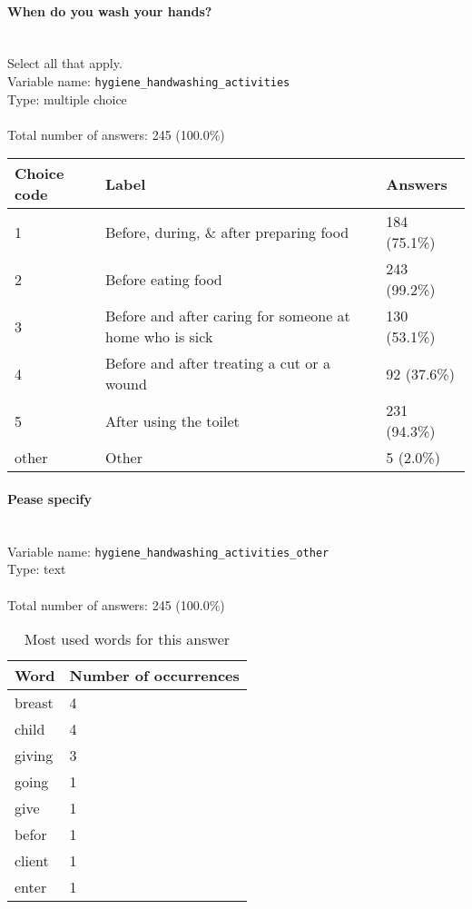 \documentclass[11.5pt, a4paper]{scrartcl}
\begin{document}
\paragraph{When do you wash your hands?}
\ \\ {\small Select all that apply.}
\  \\Variable name: \texttt{hygiene\_handwashing\_activities}\\
Type: multiple choice\\
\\Total number of answers: 245 (100.0\%)
\\[0.2em] \begin{tabular}{p{4cm}|p{8cm}|p{3cm}}
Choice code & Label & Answers \\
\hline
1 & Before, during, \& after preparing food& \cellcolor{color3}184 (75.1\%)\\
\cellcolor{mygray} 2 & \cellcolor{mygray}Before eating food & \cellcolor{color4}243 (99.2\%)\\
3 & Before and after caring for someone at home who is sick& \cellcolor{color2}130 (53.1\%)\\
\cellcolor{mygray} 4 & \cellcolor{mygray}Before and after treating a cut or a wound & \cellcolor{color1}92 (37.6\%)\\
5 & After using the toilet& \cellcolor{color4}231 (94.3\%)\\
\cellcolor{mygray} other & \cellcolor{mygray}Other & \cellcolor{color0}5 (2.0\%)\\
\end{tabular}
\paragraph{Pease specify}
\  \\Variable name: \texttt{hygiene\_handwashing\_activities\_other}\\
Type: text\\
\\Total number of answers: 245 (100.0\%)
\\[0.2em]\begin{table}[H]
 \begin{tabular}{p{4cm}|p{8cm}}
Word & Number of occurrences  \\
\hline
\cellcolor{mygray}breast&\cellcolor{mygray}4\\
\hline
child&4\\
\hline
\cellcolor{mygray}giving&\cellcolor{mygray}3\\
\hline
going&1\\
\hline
\cellcolor{mygray}give&\cellcolor{mygray}1\\
\hline
befor&1\\
\hline
\cellcolor{mygray}client&\cellcolor{mygray}1\\
\hline
enter&1\\
\hline
\end{tabular}
\caption{\label{tab:table-name} Most used words for this answer}
\end{table}
\end{document}
